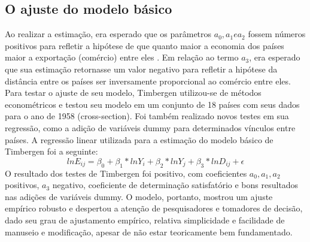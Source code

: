 \documentclass[12pt]{article}
\begin{document}
\subsection{O ajuste do modelo básico}
	Ao realizar a estimação, era esperado que os parâmetros $a_0, a_1 e a_2$ fossem números positivos para refletir a hipótese de que quanto maior a economia dos países maior a exportação (comércio) entre eles \cite{fabio1}. Em relação ao termo $a_3$, era esperado que sua estimação retornasse um valor negativo para refletir a hipótese da distância entre os países ser inversamente proporcional ao comércio entre eles. 
Para testar o ajuste de seu modelo, Timbergen utilizou-se de métodos econométricos e testou seu modelo em um conjunto de 18 países com seus dados para o ano de 1958 (cross-section). Foi também realizado novos testes em sua regressão, como a adição de variáveis dummy para determinados vínculos entre países. A regressão linear utilizada para a estimação do modelo básico de Timbergen foi a seguinte: \[ln E_{ij} = \beta_0 + \beta_1 * ln Y_i + \beta_2 * ln Y_j + \beta_3 * ln D_{ij} + \epsilon\]  
	O resultado dos testes de Timbergen foi positivo, com coeficientes $a_0, a_1, a_2$ positivos, $a_3$ negativo, coeficiente de determinação satisfatório e bons resultados nas adições de variáveis dummy. O modelo, portanto, mostrou um ajuste empírico robusto e despertou a atenção de pesquisadores e tomadores de decisão, dado seu grau de ajustamento empírico, relativa simplicidade e facilidade de manuseio e modificação, apesar de não estar teoricamente bem fundamentado.  
\end{document}
